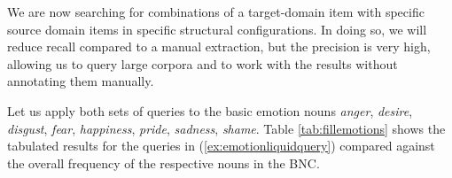 We are now searching for combinations of a target-domain item with specific source domain items in specific structural configurations. In doing so, we will reduce recall compared to a manual extraction, but the precision is very high, allowing us to query large corpora and to work with the results without annotating them manually.

Let us apply both sets of queries to the basic emotion nouns \textit{anger}, \textit{desire}, \textit{disgust}, \textit{fear}, \textit{happiness}, \textit{pride}, \textit{sadness}, \textit{shame}. Table \ref{tab:fillemotions} shows the tabulated results for the queries in (\ref{ex:emotionliquidquery}) compared against the overall frequency of the respective nouns in the BNC.

\begin{table}[!htbp]
\caption{The metaphor  (BNC)}
\label{tab:fillemotions}
\end{table}
